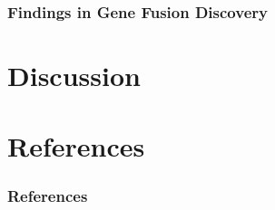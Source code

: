 \documentclass{beamer}
\begin{document}
    \begin{frame}
        \frametitle{Findings in Gene Fusion Discovery}
    \end{frame}

    \section{Discussion}

    \section{References}
    \begin{frame}[allowframebreaks]
        \frametitle{References}
        
        
    \end{frame}
\end{document}
